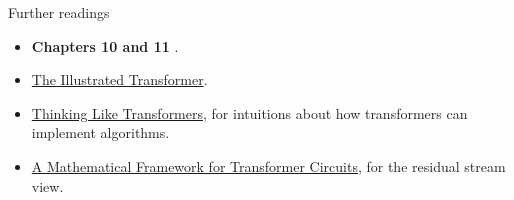 \begin{frame}{Further readings}
    \setlength{\parskip}{6pt}

    \begin{itemize}
        \item \textbf{Chapters 10 and 11} .
        \item \href{https://jalammar.github.io/illustrated-transformer/}{The Illustrated Transformer}.
        \item \href{https://srush.github.io/raspy/}{Thinking Like Transformers}, for intuitions about how transformers can implement algorithms.
        \item \href{https://transformer-circuits.pub/2021/framework/index.html}{A Mathematical Framework for Transformer Circuits}, for the residual stream view.
    \end{itemize}

\end{frame}
